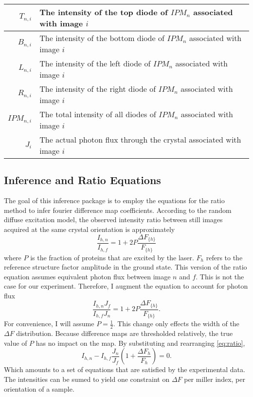 \documentclass{report}
\begin{document}
\begin{center}
\begin{tabular}{r | p{}}
$T_{n,i}$ & The intensity of the top diode of $IPM_n$ associated with image $i$ \\ \hline
$B_{n,i}$ & The intensity of the bottom diode of $IPM_n$ associated with image $i$ \\ \hline
$L_{n,i}$ & The intensity of the left diode of $IPM_n$ associated with image $i$ \\ \hline
$R_{n,i}$ & The intensity of the right diode of $IPM_n$ associated with image $i$ \\ \hline
$IPM_{n,i}$ & The total intensity of all diodes of $IPM_n$ associated with image $i$ \\ \hline
$J_i$ & The actual photon flux through the crystal associated with image $i$ \\ 
\end{tabular} 
\end{center}

\subsection{Inference and Ratio Equations}
The goal of this inference package is to employ the equations for the ratio method \cite{coppens} to infer fourier difference map coefficients. 
According to the random diffuse excitation model, the observed intensity ratio between still images acquired at the same crystal orientation is approximately
\begin{equation}
\frac{I_{h,n}}{I_{h,f}} =  1 + 2P\frac{\Delta F_{\{h\}}} {F_{\{h\}}}
\end{equation}
where $P$ is the fraction of proteins that are excited by the laser. 
$F_{h}$ refers to the reference structure factor amplitude in the ground state.
This version of the ratio equation assumes equivalent photon flux between image $n$ and $f$. 
This is not the case for our experiment.
Therefore, I augment the equation to account for photon flux
\begin{equation}\label{eq:ratio}
\frac{I_{h,n}J_f}{I_{h,f}J_n} =  1 + 2P\frac{\Delta F_{\{h\}}} {F_{\{h\}}}.
\end{equation}
For convenience, I will assume $P=\frac{1}{2}$. 
This change only effects the width of the $\Delta F$ distribution. 
Because difference maps are thresholded relatively, the true value of $P$ has no impact on the map. 
By substituting and rearranging \eqref{eq:ratio}, 
\begin{equation}
I_{h,n} - I_{h,f} \frac{J_n}{J_f} ( 1 + \frac{\Delta F_{h}} {F_{h}}) = 0. 
\end{equation}
Which amounts to a set of equations that are satisfied by the experimental data. 
The intensities can be sumed to yield one constraint on $\Delta F$ per miller index, per orientation of a sample. 
\end{document}
